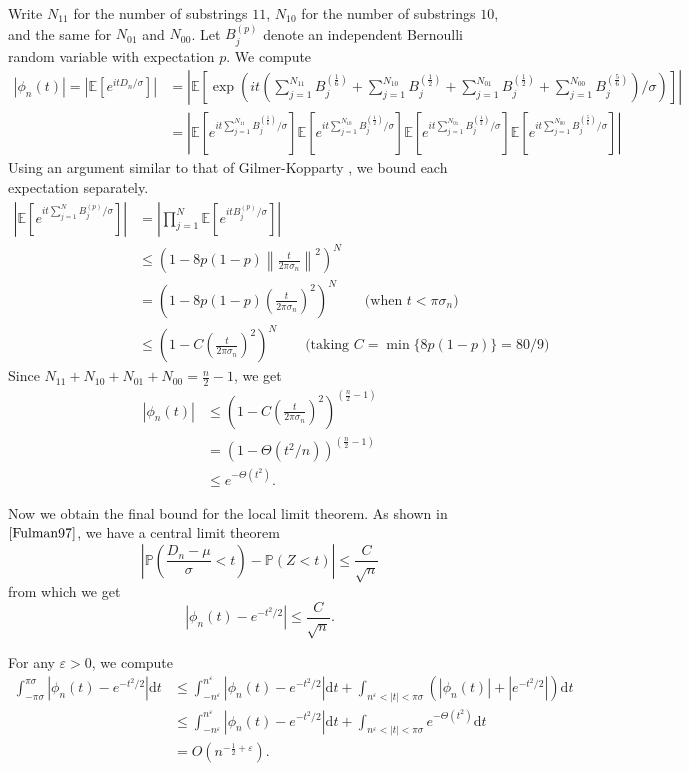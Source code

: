 \documentclass{article}
\newcommand{\p}[1]{\left(#1\right)}
\newcommand{\f}[2]{\frac{#1}{#2}}
\newcommand{\abs}[1]{\left\lvert#1\right\rvert}
\newcommand{\E}{\mathbb{E}}
\renewcommand{\P}{\mathbb{P}}
\newcommand{\norm}[1]{\left\lVert#1\right\rVert}
\newcommand{\s}[1]{\left[#1\right]}
\renewcommand{\d}{\mathrm{d}}
\newcommand{\eps}{\varepsilon}
\begin{document}
	Write $N_{11}$ for the number of substrings $11$, $N_{10}$ for the number of substrings $10$, and the same for $N_{01}$ and $N_{00}$. Let $B^{(p)}_j$ denote an independent Bernoulli random variable with expectation $p$. We compute
	\begin{align*}
		\abs{\phi_n(t)}
		= \abs{\E \s{e^{it D_n/\sigma}}}
		&= \abs{\E \s{\exp\p{it\p{\sum_{j=1}^{N_{11}} B^{(\f{1}{6})}_j + \sum_{j=1}^{N_{10}} B^{(\f{1}{2})}_j + \sum_{j=1}^{N_{01}} B^{(\f{1}{2})}_j + \sum_{j=1}^{N_{00}} B^{(\f{5}{6})}_j}/\sigma}}} \\
		&= \abs{
			\E \s{e^{it\sum_{j=1}^{N_{11}} B^{(\f{1}{6})}_j/\sigma}}
			\E \s{e^{it\sum_{j=1}^{N_{10}} B^{(\f{1}{2})}_j/\sigma}}
			\E \s{e^{it\sum_{j=1}^{N_{01}} B^{(\f{1}{2})}_j/\sigma}}
			\E \s{e^{it\sum_{j=1}^{N_{00}} B^{(\f{5}{6})}_j/\sigma}}
		}
	\end{align*}
	Using an argument similar to that of Gilmer-Kopparty \cite{GilmerKopparty14}, we bound each expectation separately.
	\begin{align*}
		\abs{\E \s{e^{it \sum_{j=1}^{N} B^{(p)}_j/\sigma}}}
		&= \abs{\prod_{j=1}^{N} \E \s{e^{it B^{(p)}_j/\sigma}}} \\
		&\leq \p{1 - 8p(1-p) \norm{\f{t}{2\pi \sigma_n}}^2}^N \\
		&= \p{1 - 8p(1-p) \p{\f{t}{2\pi \sigma_n}}^2}^N \qquad \text{(when $t < \pi \sigma_n$)} \\
		&\leq \p{1 - C \p{\f{t}{2\pi \sigma_n}}^2}^N \qquad \text{(taking $C = \min{\{8p(1-p)\}} = 80/9$)}
	\end{align*}
	Since $N_{11} + N_{10} + N_{01} + N_{00} = \f{n}{2} - 1$, we get
	\begin{align*}
		\abs{\phi_n(t)}
		&\leq \p{1 - C \p{\f{t}{2\pi \sigma_n}}^2}^{(\f{n}{2} - 1)} \\
		&= \p{1 - \Theta(t^2/n)}^{(\f{n}{2} - 1)} \\
		&\leq e^{-\Theta(t^2)}.
	\end{align*}

	Now we obtain the final bound for the local limit theorem. As shown in $\cite{Fulman97}$, we have a central limit theorem
	\[ \abs{\P(\f{D_n - \mu}{\sigma} < t) - \P(Z < t)} \leq \f{C}{\sqrt{n}} \]
	from which we get
	\[ \abs{\phi_n(t) - e^{-t^2/2}} \leq \f{C}{\sqrt{n}}. \]

	For any $\eps > 0$, we compute
	\begin{align*}
		\int_{-\pi \sigma}^{\pi \sigma} \abs{\phi_n(t) - e^{-t^2/2}} \d t
		&\leq \int_{-n^\eps}^{n^\eps} \abs{\phi_n(t) - e^{-t^2/2}} \d t + \int_{n^\eps < \abs{t} < \pi \sigma} (\abs{\phi_n(t)} + |e^{-t^2/2}|) \d t \\
		&\leq \int_{-n^\eps}^{n^\eps} \abs{\phi_n(t) - e^{-t^2/2}} \d t + \int_{n^\eps < \abs{t} < \pi \sigma} e^{-\Theta(t^2)} \d t \\
		&= O(n^{-\f{1}{2} + \eps}).
	\end{align*}
\end{document}
